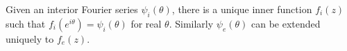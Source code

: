 Given an interior Fourier series $\psi_i(\theta)$, there is a unique inner function $f_i(z)$ such that $f_i(e^{i\theta}) = \psi_i(\theta)$ for real $\theta$. Similarly $\psi_e(\theta)$ can be extended uniquely to $f_e(z)$.